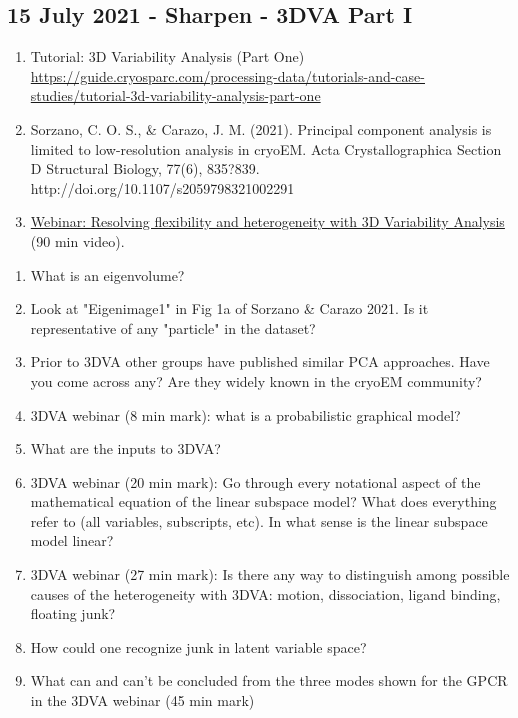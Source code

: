 \documentclass[11pt, oneside]{article}   	%
\begin{document}
\pagebreak

\subsection{15 July 2021 - Sharpen - 3DVA Part I}
\begin{enumerate}
	\item Tutorial: 3D Variability Analysis (Part One) \url{https://guide.cryosparc.com/processing-data/tutorials-and-case-studies/tutorial-3d-variability-analysis-part-one}
	\item Sorzano, C. O. S., \& Carazo, J. M. (2021). Principal component analysis is limited to low-resolution analysis in cryoEM. Acta Crystallographica Section D Structural Biology, 77(6), 835?839. http://doi.org/10.1107/s2059798321002291
	\item \href{https://youtu.be/0O781Od1z_E}{Webinar: Resolving flexibility and heterogeneity with 3D Variability Analysis} (90 min video).
\end{enumerate}
\begin{enumerate}
	\item What is an eigenvolume?
	\item Look at "Eigenimage1" in Fig 1a of Sorzano \& Carazo 2021. Is it representative of any "particle" in the dataset?
	\item Prior to 3DVA other groups have published similar PCA approaches. Have you come across any? Are they widely known in the cryoEM community? 
	\item 3DVA webinar (8 min mark): what is a probabilistic graphical model?
	\item What are the inputs to 3DVA? 
	\item 3DVA webinar (20 min mark): Go through every notational aspect of the mathematical equation of the linear subspace model? What does everything refer to (all variables, subscripts, etc). In what sense is the linear subspace model linear?
	\item 3DVA webinar (27 min mark): Is there any way to distinguish among possible causes of the heterogeneity with 3DVA: motion, dissociation, ligand binding, floating junk?
	\item How could one recognize junk in latent variable space?
	\item What can and can't be concluded from the three modes shown for the GPCR in the 3DVA webinar (45 min mark)
\end{enumerate}
\end{document}
